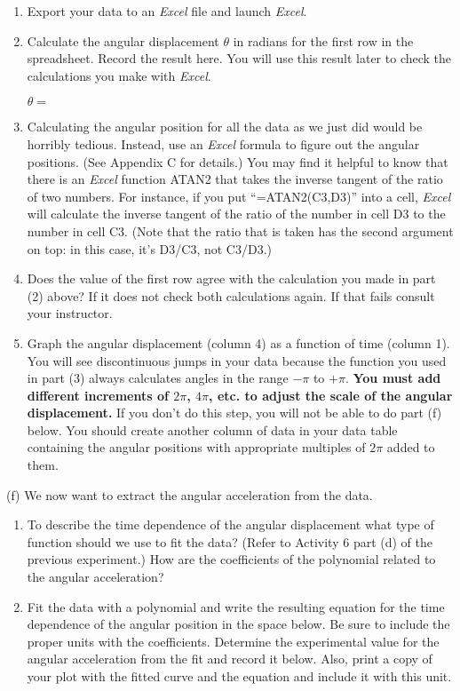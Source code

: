 \begin{enumerate}
\item Export your data to an \textit{Excel} file and launch 
\textit{Excel}.

\item Calculate the angular displacement \( \theta  \) in radians for the first row
in the spreadsheet. Record the result here.
You will use this result later to check the calculations you make with 
\textit{Excel}.


$\theta =$

\item Calculating the angular position for all the data as we just did
would be horribly tedious. Instead, use an {\it Excel} formula to
figure out the angular positions.  (See Appendix C for details.)
You may find it helpful to know that there is an {\it Excel} function
ATAN2 that takes the inverse tangent of the ratio of two numbers.
For instance, if you put ``=ATAN2(C3,D3)'' into a cell, {\it Excel}
will calculate the inverse tangent of the ratio of the number
in cell D3 to the number in cell C3.  (Note that the ratio
that is taken has the second argument on top: in this case, it's 
D3/C3, not C3/D3.)

\item Does the value of the first row agree with the calculation you made in part
(2) above? If it does not check both calculations again. If that fails consult
your instructor. 
\item Graph the angular displacement (column 4) as a function of time (column 1).
You will see discontinuous jumps in your data because the function you used
in part (3) always calculates angles in the range \( -\pi  \) to \( +\pi  \).
\textbf{You must add different increments of \( 2\pi  \), \(4 \pi  \), etc. to adjust
the scale of the angular displacement.} If you don't do this step, you will not be able to do part (f) below.  You should create another
column of data in your data table containing the angular positions with
appropriate multiples of $2\pi$ added to them.
\end{enumerate}
(f) We now want to extract the angular acceleration from the data.

\begin{enumerate}
\item To describe the time dependence of the angular displacement what type of 
function should we use to fit the data? (Refer to Activity 6 part (d) of the 
previous experiment.) How are the coefficients of the polynomial related to 
the angular acceleration?
\vspace{30mm}


\item Fit the data with a polynomial and write the resulting equation for the 
time dependence of the angular position in the space below. Be sure to include 
the proper units with the coefficients. Determine the experimental value for the
angular acceleration from the fit and record it below. Also, print a copy of
your plot with the fitted curve and the equation and include it with this unit.
\vspace{50mm}

\end{enumerate}


